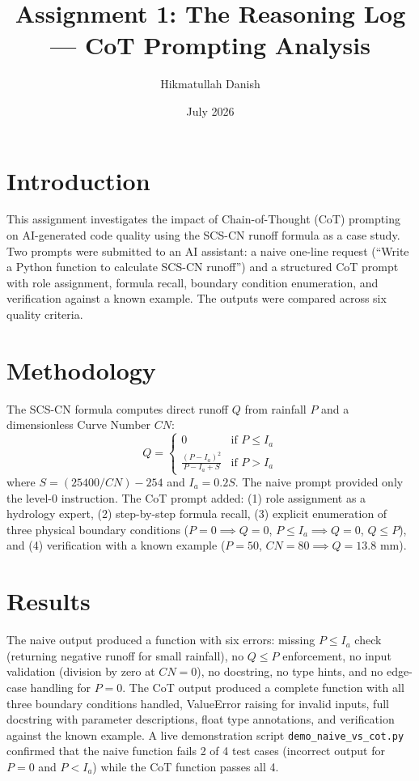 \documentclass[12pt,a4paper]{article}
\title{Assignment 1: The Reasoning Log — CoT Prompting Analysis}
\author{Hikmatullah Danish \quad 3125999089}
\date{July 2026}
\begin{document}
\maketitle

\section{Introduction}
This assignment investigates the impact of Chain-of-Thought (CoT) prompting on AI-generated code quality using the SCS-CN runoff formula as a case study. Two prompts were submitted to an AI assistant: a naive one-line request (``Write a Python function to calculate SCS-CN runoff'') and a structured CoT prompt with role assignment, formula recall, boundary condition enumeration, and verification against a known example. The outputs were compared across six quality criteria.

\section{Methodology}
The SCS-CN formula computes direct runoff $Q$ from rainfall $P$ and a dimensionless Curve Number $CN$:
\begin{equation}
Q = \begin{cases}
0 & \text{if } P \leq I_a \\
\displaystyle\frac{(P - I_a)^2}{P - I_a + S} & \text{if } P > I_a
\end{cases}
\end{equation}
where $S = (25400/CN) - 254$ and $I_a = 0.2S$. The naive prompt provided only the level-0 instruction. The CoT prompt added: (1) role assignment as a hydrology expert, (2) step-by-step formula recall, (3) explicit enumeration of three physical boundary conditions ($P=0 \implies Q=0$, $P \leq I_a \implies Q=0$, $Q \leq P$), and (4) verification with a known example ($P=50$, $CN=80 \implies Q=13.8$ mm).

\section{Results}
The naive output produced a function with six errors: missing $P \leq I_a$ check (returning negative runoff for small rainfall), no $Q \leq P$ enforcement, no input validation (division by zero at $CN=0$), no docstring, no type hints, and no edge-case handling for $P=0$. The CoT output produced a complete function with all three boundary conditions handled, ValueError raising for invalid inputs, full docstring with parameter descriptions, float type annotations, and verification against the known example. A live demonstration script \texttt{demo\_naive\_vs\_cot.py} confirmed that the naive function fails 2 of 4 test cases (incorrect output for $P=0$ and $P<I_a$) while the CoT function passes all 4.
\end{document}
